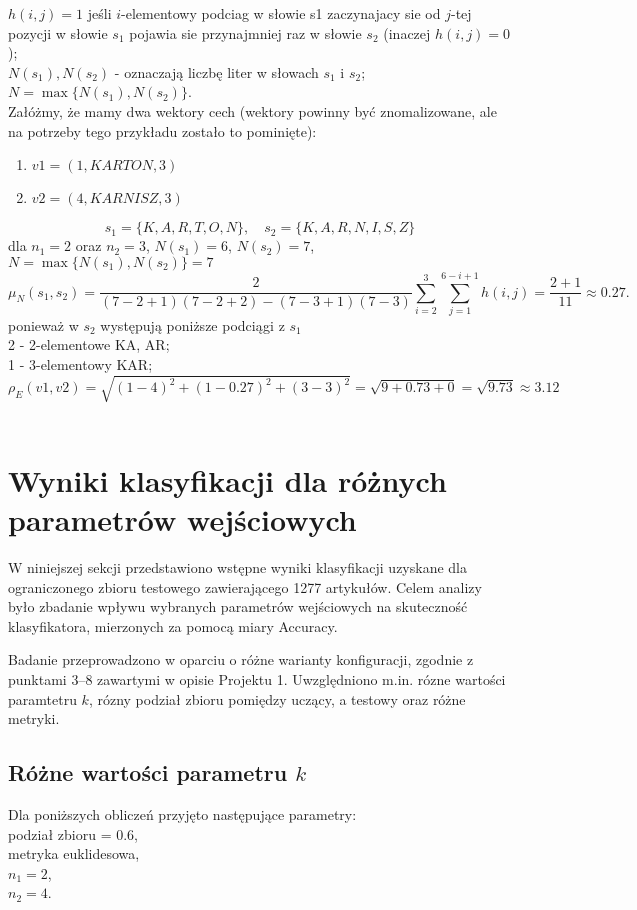 \documentclass{article}
\begin{document}
\(h(i,j) = 1\) jeśli \(i\)-elementowy podciag w słowie s1 zaczynajacy sie od \(j\)-tej
pozycji w słowie \(s_1\) pojawia sie przynajmniej raz w słowie \(s_2\) (inaczej
\(h(i,j) = 0\));\\

\(N(s_1), N(s_2)\) - oznaczają liczbę liter w słowach \( s_1\) i \( s_2\);\\


\(N = \max \{N(s_1), N(s_2)\}\).\\



Załóżmy, że mamy dwa wektory cech (wektory powinny być znomalizowane, ale na potrzeby tego przykładu zostało to pominięte):
\begin{enumerate}
    \item \(v1 = (1, KARTON, 3)\)
    \item \(v2 = (4, KARNISZ, 3)\)
\end{enumerate}
\[
s_1 = \{K, A, R, T, O, N\}, \quad s_2 = \{K, A, R, N, I, S, Z\}
\]
dla \(n_1 = 2\) oraz \(n_2 = 3\), \(N(s_1) = 6\), \(N(s_2) = 7\), \(N = \max \{N(s_1), N(s_2)\} = 7\)
\[
    \mu_N(s_1, s_2) = \frac{2}{(7 - 2 + 1)(7 - 2 + 2) - (7 - 3 + 1)(7 - 3)} \sum_{i=2}^{3} \sum_{j=1}^{6 - i + 1} h(i, j) = \frac{2 + 1}{11} \approx 0.27.
 \]
 ponieważ w \(s_2\) występują poniższe podciągi z \(s_1\)\\
 2 - 2-elementowe KA, AR;\\
 1 - 3-elementowy KAR;
 \[
     \rho_E(v1, v2) = \sqrt{(1-4)^2 + (1 - 0.27)^2 + (3-3)^2} = \sqrt{9 + 0.73 + 0} = \sqrt{9.73} \approx 3.12
\] \\


\section{Wyniki klasyfikacji dla różnych parametrów wejściowych}
W niniejszej sekcji przedstawiono wstępne wyniki klasyfikacji uzyskane dla ograniczonego zbioru testowego zawierającego 1277 artykułów. Celem analizy było zbadanie wpływu wybranych parametrów wejściowych na skuteczność klasyfikatora, mierzonych za pomocą miary Accuracy. 

Badanie przeprowadzono w oparciu o różne warianty konfiguracji, zgodnie z punktami 3–8 zawartymi w opisie Projektu 1. Uwzględniono m.in. rózne wartości paramtetru \(k\), rózny podział zbioru pomiędzy uczący, a testowy oraz różne metryki.

\subsection{Różne wartości parametru \(k\)}
Dla poniższych obliczeń przyjęto następujące parametry:\\ podział zbioru = 0.6, \\metryka euklidesowa, \\\(n_1 = 2\),\\ \(n_2 = 4\). 
\end{document}
